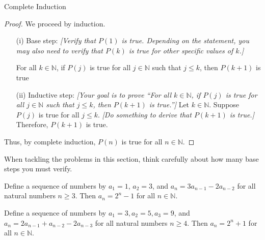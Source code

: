 \begin{section}{Complete Induction}
\begin{skeleton}
\begin{mdframed}[style=skeleton]
\begin{proof}
We proceed by induction.
\begin{enumerate}\setlength{\itemsep}{0in}
\item[(i)] Base step: \emph{[Verify that $P(1)$ is true.  Depending on the statement, you may also need to verify that $P(k)$ is true for other specific values of $k$.]}

For all $k \in \mathbb{N}$, if $P(j)$ is true for all $j\in \mathbb{N}$ such that $j \leq k$, then $P(k+1)$ is true

\item[(ii)] Inductive step:  \emph{[Your goal is to prove ``For all $k\in\mathbb{N}$, if $P(j)$ is true for all $j\in \mathbb{N}$ such that $j \leq k$, then $P(k+1)$ is true.'']} Let $k \in \mathbb{N}$.  Suppose $P(j)$ is true for all $j \leq k$. \emph{[Do something to derive that $P(k+1)$ is true.]} Therefore, $P(k+1)$ is true.
\end{enumerate}
Thus, by complete induction, $P(n)$ is true for all $n \in\mathbb{N}$.
\end{proof}
\end{mdframed}
\end{skeleton}

When tackling the problems in this section, think carefully about how many base steps you must verify.

\begin{theorem}
Define a sequence of numbers by $a_1 = 1$, $a_2 = 3$, and $a_n = 3a_{n-1} - 2a_{n-2}$ for all natural numbers $n \geq 3$.  Then $a_n = 2^n - 1$ for all $n \in \mathbb{N}$.  
\end{theorem}

\begin{theorem}
Define a sequence of numbers by $a_1 = 3, a_2 = 5, a_3 = 9$, and $a_n = 2a_{n-1} + a_{n-2}-2a_{n-3}$ for all natural numbers $n \geq 4$.  Then $a_n = 2^n + 1$ for all $n \in \mathbb{N}$.  
\end{theorem}




\end{section}
